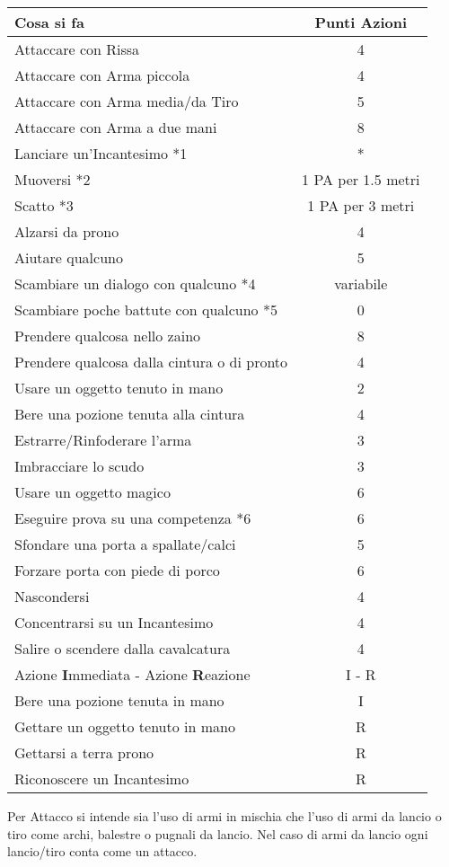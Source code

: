 \documentclass[12pt,a4paper,twoside,openany]{book}
\begin{document}
\begin{tabularx}{0.95\textwidth}{Xc}
\textbf{Cosa si fa}  & \textbf{Punti Azioni}\\
\toprule
Attaccare con Rissa					& 4\\
Attaccare con Arma piccola			& 4\\
Attaccare con Arma media/da Tiro	& 5\\
Attaccare con Arma a due mani		& 8\\
Lanciare un'Incantesimo *1			& *\\
Muoversi *2							& 1 PA per 1.5 metri\\
Scatto *3							& 1 PA per 3 metri\\
Alzarsi da prono					& 4\\
Aiutare qualcuno					& 5\\
Scambiare un dialogo con qualcuno *4	& variabile\\
Scambiare poche battute con qualcuno *5& 0\\
Prendere qualcosa nello zaino		& 8\\
Prendere qualcosa dalla cintura o di pronto & 4\\
Usare un oggetto tenuto in mano		& 2\\
Bere una pozione tenuta alla cintura& 4\\
Estrarre/Rinfoderare l'arma			& 3\\
Imbracciare lo scudo				& 3\\
Usare un oggetto magico				& 6\\
Eseguire prova su una competenza *6	& 6\\
Sfondare una porta a spallate/calci	& 5\\
Forzare porta con piede di porco	& 6\\
Nascondersi							& 4\\
Concentrarsi su un Incantesimo		& 4\\
Salire o scendere dalla cavalcatura	& 4\\
Azione \textbf{I}mmediata - Azione \textbf{R}eazione& I - R\\
Bere una pozione tenuta in mano& I\\
Gettare un oggetto tenuto in mano& R\\
Gettarsi a terra prono& R\\
Riconoscere un Incantesimo& R\\
\end{tabularx}

\medskip

Per Attacco si intende sia l'uso di armi in mischia che l'uso di armi da lancio o tiro come archi, balestre o pugnali da lancio. Nel caso di armi da lancio ogni lancio/tiro conta come un attacco.
\end{document}
